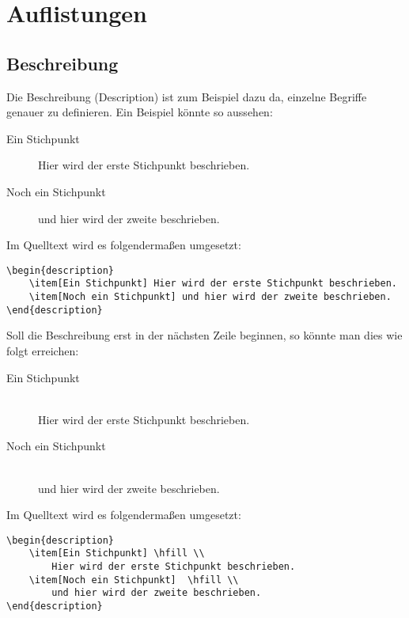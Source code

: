 
\chapter{Auflistungen}

\section{Beschreibung}
Die Beschreibung (Description) ist zum Beispiel dazu da, einzelne Begriffe genauer zu definieren.
Ein Beispiel könnte so aussehen:
\begin{description}
    \item[Ein Stichpunkt] Hier wird der erste Stichpunkt beschrieben.
    \item[Noch ein Stichpunkt] und hier wird der zweite beschrieben. 
\end{description}

Im Quelltext wird es folgendermaßen umgesetzt:
\begin{lstlisting}
\begin{description}
    \item[Ein Stichpunkt] Hier wird der erste Stichpunkt beschrieben.
    \item[Noch ein Stichpunkt] und hier wird der zweite beschrieben. 
\end{description}
\end{lstlisting}

Soll die Beschreibung erst in der nächsten Zeile beginnen, so könnte man dies wie folgt erreichen:
\begin{description}
    \item[Ein Stichpunkt] \hfill \\
        Hier wird der erste Stichpunkt beschrieben.
    \item[Noch ein Stichpunkt]  \hfill \\
        und hier wird der zweite beschrieben. 
\end{description}

Im Quelltext wird es folgendermaßen umgesetzt:
\begin{lstlisting}
\begin{description}
    \item[Ein Stichpunkt] \hfill \\
        Hier wird der erste Stichpunkt beschrieben.
    \item[Noch ein Stichpunkt]  \hfill \\
        und hier wird der zweite beschrieben. 
\end{description}
\end{lstlisting}

